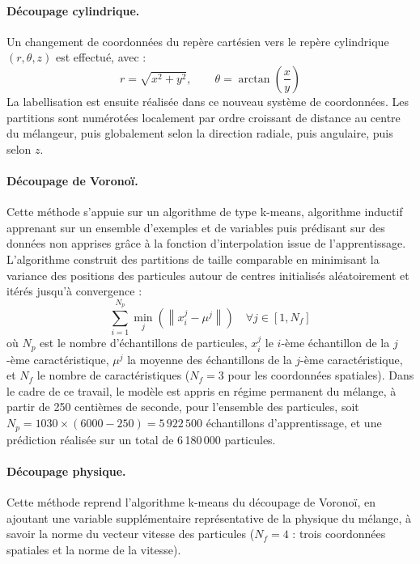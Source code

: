 \documentclass{MemoireMaster}
\begin{document}
\paragraph{Découpage cylindrique.} Un changement de coordonnées du repère cartésien vers le repère cylindrique $(r, \theta, z)$ est effectué, avec :
\begin{equation}
r = \sqrt{x^2+y^2}, \qquad \theta = \arctan\left(\frac{x}{y}\right)
\end{equation}
La labellisation est ensuite réalisée dans ce nouveau système de coordonnées. Les partitions sont numérotées localement par ordre croissant de distance au centre du mélangeur, puis globalement selon la direction radiale, puis angulaire, puis selon $z$.

\paragraph{Découpage de Voronoï.} Cette méthode s'appuie sur un algorithme de type k-means, algorithme inductif apprenant sur un ensemble d'exemples et de variables puis prédisant sur des données non apprises grâce à la fonction d'interpolation issue de l'apprentissage. L'algorithme construit des partitions de taille comparable en minimisant la variance des positions des particules autour de centres initialisés aléatoirement et itérés jusqu'à convergence :
\begin{equation}
\sum_{i=1}^{N_p} \min_j \left( \left\| x_i^j - \mu^j \right\| \right) \quad \forall j \in [1, N_f]
\end{equation}
où $N_p$ est le nombre d'échantillons de particules, $x_i^j$ le $i$-ème échantillon de la $j$-ème caractéristique, $\mu^j$ la moyenne des échantillons de la $j$-ème caractéristique, et $N_f$ le nombre de caractéristiques ($N_f=3$ pour les coordonnées spatiales). Dans le cadre de ce travail, le modèle est appris en régime permanent du mélange, à partir de 250 centièmes de seconde, pour l'ensemble des particules, soit $N_p = 1030 \times (6000-250) = 5\,922\,500$ échantillons d'apprentissage, et une prédiction réalisée sur un total de 6\,180\,000 particules.

\paragraph{Découpage physique.} Cette méthode reprend l'algorithme k-means du découpage de Voronoï, en ajoutant une variable supplémentaire représentative de la physique du mélange, à savoir la norme du vecteur vitesse des particules ($N_f = 4$ : trois coordonnées spatiales et la norme de la vitesse).
\end{document}

